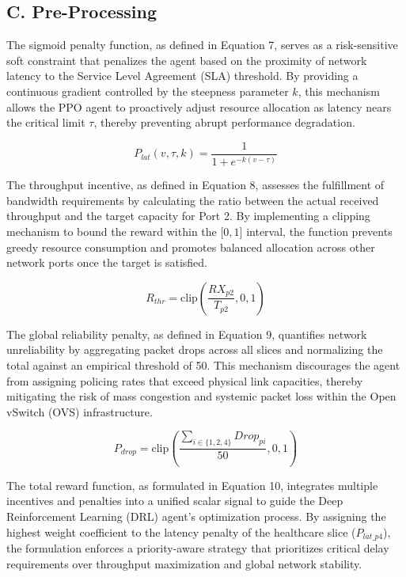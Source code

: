 \subsection{C. Pre-Processing}\label{c.-pre-processing}

The sigmoid penalty function, as defined in Equation 7, serves as a risk-sensitive soft constraint that penalizes the agent based on the proximity of network latency to the Service Level Agreement (SLA) threshold. By providing a continuous gradient controlled by the steepness parameter \(k\), this mechanism allows the PPO agent to proactively adjust resource allocation as latency nears the critical limit \(\tau\), thereby preventing abrupt performance degradation.

\begin{equation}\label{eq:7}
P_{lat}(v,\tau,k) = \frac{1}{1 + e^{- k(v - \tau)}}
\end{equation}

The throughput incentive, as defined in Equation 8, assesses the fulfillment of bandwidth requirements by calculating the ratio between the actual received throughput and the target capacity for Port 2. By implementing a clipping mechanism to bound the reward within the \(\lbrack 0,1\rbrack\) interval, the function prevents greedy resource consumption and promotes balanced allocation across other network ports once the target is satisfied.

\begin{equation}\label{eq:8}
R_{thr} = \text{clip}\left( \frac{RX_{p2}}{T_{p2}},0,1 \right)
\end{equation}

The global reliability penalty, as defined in Equation 9, quantifies network unreliability by aggregating packet drops across all slices and normalizing the total against an empirical threshold of 50. This mechanism discourages the agent from assigning policing rates that exceed physical link capacities, thereby mitigating the risk of mass congestion and systemic packet loss within the Open vSwitch (OVS) infrastructure.

\begin{equation}\label{eq:9}
P_{drop} = \text{clip}\left( \frac{\sum_{i \in \text{\{}1,2,4\text{\}}}^{}{Drop_{pi}}}{50},0,1 \right)
\end{equation}

The total reward function, as formulated in Equation 10, integrates multiple incentives and penalties into a unified scalar signal to guide the Deep Reinforcement Learning (DRL) agent's optimization process. By assigning the highest weight coefficient to the latency penalty of the healthcare slice (\(P_{lat\text{\_}p4}\)), the formulation enforces a priority-aware strategy that prioritizes critical delay requirements over throughput maximization and global network stability.

